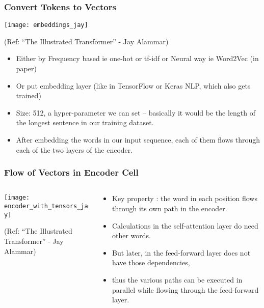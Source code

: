 \begin{frame}[fragile]\frametitle{Convert Tokens to Vectors}


\begin{center}
\texttt{[image: embeddings\_jay]}


{\tiny (Ref: ``The Illustrated Transformer'' - Jay Alammar)}
\end{center}		


\begin{itemize}
\item Either by Frequency based ie one-hot or tf-idf or Neural way ie Word2Vec (in paper)
\item Or put embedding layer (like in TensorFlow or Keras NLP, which also gets trained)
\item Size: 512, a hyper-parameter we can set – basically it would be the length of the longest sentence in our training dataset.
\item After embedding the words in our input sequence, each of them flows through each of the two layers of the encoder.
\end{itemize}

\end{frame}

\begin{frame}[fragile]\frametitle{Flow of Vectors in Encoder Cell}


\begin{columns}
    \begin{column}[T]{0.5\linewidth}
\begin{center}
\texttt{[image: encoder\_with\_tensors\_jay]}


{\tiny (Ref: ``The Illustrated Transformer'' - Jay Alammar)}
\end{center}		

		\end{column}
    \begin{column}[T]{0.5\linewidth}
\begin{itemize}
\item Key property : the word in each position flows through its own path in the encoder. 
\item Calculations in the self-attention layer do need other words. 
\item But later, in the feed-forward layer does not have those dependencies, \item thus the various paths can be executed in parallel while flowing through the feed-forward layer.
\end{itemize}
    \end{column}
  \end{columns}
\end{frame}

